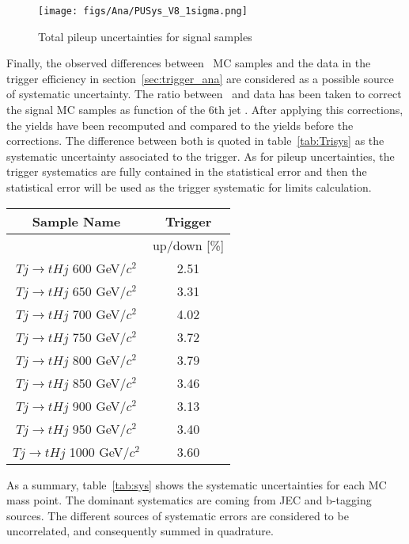 \begin{figure}[!Hhtbp]
  \begin{center}
    \texttt{[image: figs/Ana/PUSys\_V8\_1sigma.png]}
    \caption{Total pileup uncertainties for signal samples}
    \label{fig:TotalPUSys}
  \end{center}
\end{figure}

Finally, the observed differences between \ttbar~MC samples and the data in the trigger efficiency in section~\ref{sec:trigger_ana} are considered as a possible source of systematic uncertainty. The ratio between \ttbar~and data has been taken to correct the signal MC samples as function of the 6th jet \pt. After applying this corrections, the yields have been recomputed and compared to the yields before the corrections. The difference between both is quoted in table~\ref{tab:Trisys} as the systematic uncertainty associated to the trigger. As for pileup uncertainties, the trigger systematics are fully contained in the statistical error and then the statistical error will be used as the trigger systematic for limits calculation.

\begin{table*}[htbH]
\begin{center}
\begin{tabular}{|c|c|}
\hline 
Sample Name & Trigger \\
\hline
 & up/down [\%] \\
\hline
$Tj\rightarrow tHj$ 600 GeV/$c^{2}$ & 2.51 \\
$Tj\rightarrow tHj$ 650 GeV/$c^{2}$ & 3.31 \\
$Tj\rightarrow tHj$ 700 GeV/$c^{2}$ & 4.02 \\
$Tj\rightarrow tHj$ 750 GeV/$c^{2}$ & 3.72 \\
$Tj\rightarrow tHj$ 800 GeV/$c^{2}$ & 3.79 \\
$Tj\rightarrow tHj$ 850 GeV/$c^{2}$ & 3.46 \\
$Tj\rightarrow tHj$ 900 GeV/$c^{2}$ & 3.13 \\
$Tj\rightarrow tHj$ 950 GeV/$c^{2}$ & 3.40 \\
$Tj\rightarrow tHj$ 1000 GeV/$c^{2}$ & 3.60 \\
\hline
\end{tabular}
\caption{Trigger uncertainties for signal samples\label{tab:Trisys}}
\end{center}
\end{table*}

As a summary, table~\ref{tab:sys} shows the systematic uncertainties for each MC mass point. The dominant systematics are coming from JEC and b-tagging sources. The different sources of systematic errors are considered to be uncorrelated, and consequently summed in quadrature. %

